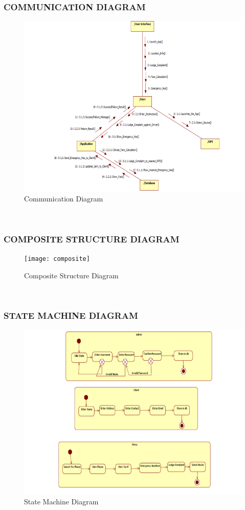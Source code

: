 \documentclass[12pt,a4paper]{article}
\begin{document}
\subsubsection{COMMUNICATION DIAGRAM}
\begin{figure}[!htb]
\centering
\includegraphics[width=15 cm]{communication}
\caption{Communication Diagram}
\end{figure}
\\
\newpage
\subsubsection{COMPOSITE STRUCTURE DIAGRAM}
\begin{figure}[!htb]
\centering
\texttt{[image: composite]}
\caption{Composite Structure Diagram}
\end{figure}
\\
\newpage
\subsubsection{STATE MACHINE DIAGRAM}
\begin{figure}[!htb]
\centering
\includegraphics[width=15 cm]{state}
\caption{State Machine Diagram}
\end{figure}
\\
\newpage
\end{document}
